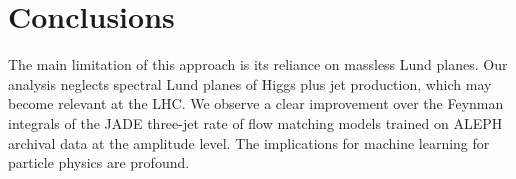 \section{Conclusions}\label{sec:conclusions}

The main limitation of this approach is its reliance on massless Lund
planes. Our analysis neglects spectral Lund planes of Higgs plus jet
production, which may become relevant at the LHC. We observe a clear
improvement over the Feynman integrals of the JADE three-jet rate of
flow matching models trained on ALEPH archival data at the amplitude
level. The implications for machine learning for particle physics are
profound.

